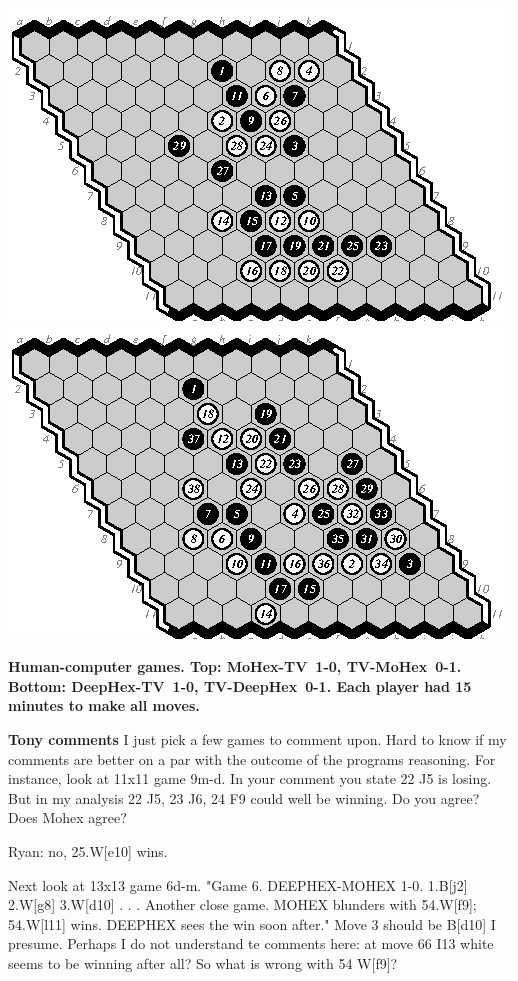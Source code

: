 \documentclass{icga}
\def\Dx{\mbox{\sc DeepHex}}
\def\Mx{\mbox{\sc MoHex}}
\def\TV{\mbox{\sc TV}} %
\begin{document}
\includegraphics[scale=1.3]{d-tony.eps}\hspace*{-2cm}\includegraphics[scale=1.3]{tony-d.eps}

{\bf Human-computer games. Top: \Mx-\TV\ 1-0, \TV-\Mx\ 0-1.
Bottom: \Dx-\TV\ 1-0, \TV-\Dx\ 0-1. Each player had 15 minutes to
make all moves.}

{\bf Tony comments}
I just pick a few games to comment upon. Hard to know if my comments are better on a par with the outcome of the programs reasoning. 
For instance, look at 11x11 game 9m-d. In your comment you state 22 J5 is losing. But in my analysis 22 J5, 23 J6, 24 F9 could well be winning. Do you agree? Does Mohex agree?  

Ryan: no, 25.W[e10] wins.

Next look at 13x13 game 6d-m. 
"Game 6. DEEPHEX-MOHEX 1-0. 1.B[j2] 2.W[g8] 3.W[d10] . . . Another close game. MOHEX blunders with
54.W[f9]; 54.W[l11] wins. DEEPHEX sees the win soon after." 
Move 3 should be B[d10] I presume. 
Perhaps I do not understand te comments here: at move 66 I13 white seems to be winning after all? So what is wrong with 54 W[f9]? 
\end{document}
